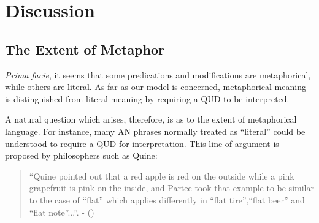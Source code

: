 \documentclass[10pt,letterpaper,twocolumn]{article}
\begin{document}






	

	




\section{Discussion}
\subsection{The Extent of Metaphor} \label{litvsmet}

\emph{Prima facie}, it seems that some predications and modifications are metaphorical, while others are literal. As far as our model is concerned, metaphorical meaning is distinguished from literal meaning by requiring a QUD to be interpreted. 



A natural question which arises, therefore, is as to the extent of metaphorical language. For instance, many AN phrases normally treated as ``literal'' could be understood to require a QUD for interpretation. This line of argument is proposed by philosophers such as Quine:
	\begin{quote}
		``Quine pointed out that a red apple is red on the outside while a pink grapefruit is pink on the inside, and Partee took that example to be similar to the case of ``flat'' which applies differently in ``flat tire'',``flat beer'' and ``flat note''...''. - (\cite{lahav}) 
	\end{quote}
\end{document}
